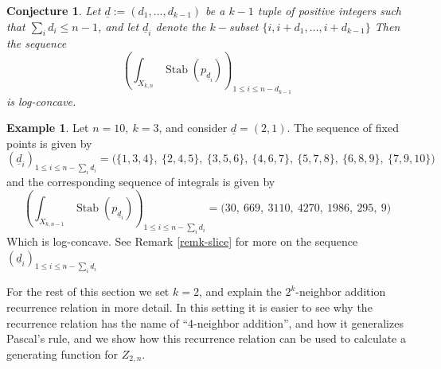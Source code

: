 \documentclass[12 pt]{article}
\theoremstyle{plain}
\theoremstyle{plain}
\theoremstyle{plain}
\theoremstyle{plain}
\theoremstyle{plain}
\theoremstyle{plain}
\theoremstyle{plain}
\theoremstyle{plain}
\theoremstyle{plain}
\newtheorem{conjecture}[theorem]{Conjecture}
\theoremstyle{plain}
\theoremstyle{remark}
\theoremstyle{remark}
\theoremstyle{definition}
\theoremstyle{definition}
\theoremstyle{definition}
\newtheorem{example}{Example}[section]
\theoremstyle{definition}
\theoremstyle{definition}
\theoremstyle{definition}
\DeclareMathOperator{\Stab}{Stab}
\begin{document}
\begin{conjecture}
    Let $\underline{d}:=(d_{1},\dots,d_{k-1})$ be a $k-1$ tuple of positive integers such that \newline$\sum_{i}d_{i}\leq n-1$, and let $\underline{d}_{i}$ denote the $k-$subset $\{i,i+d_{1},\dots, i+d_{k-1}\}$ Then the sequence 
    \[
    \left(\int_{X_{k,n}}\Stab(p_{\underline{d}_{i}})\right)_{1\leq i\leq n-d_{k-1}}
    \]
    is log-concave.
\end{conjecture}
\begin{example}\label{log-concavity-example}
    Let $n=10,\ k=3$, and consider $\underline{d}=(2,1)$. The sequence of fixed points is given by
    \[
    (\underline{d}_{i})_{1\leq i\leq n-\sum_{i}d_{i}}=\Big(\{1,3,4\},\ \{2,4,5\},\ \{3,5,6\},\ \{4,6,7\},\ \{5,7,8\},\ \{6,8,9\},\ \{7,9,10\}\Big)
    \] and the corresponding sequence of integrals is given by
    \[\left(\int_{X_{k,n-1}}\Stab(p_{\underline{d}_{i}})\right)_{1\leq i\leq n-\sum_{i}d_{i}}=\Big(30,\ 669,\ 3110,\ 4270,\ 1986,\ 295,\ 9\Big)\]
    Which is log-concave. See Remark \ref{remk-slice} for more on the sequence $(\underline{d}_{i})_{1\leq i\leq n-\sum_{i}d_{i}}$
\end{example}

For the rest of this section we set $k=2$, and explain the $2^k$-neighbor addition recurrence relation in more detail. In this setting it is easier to see why the recurrence relation has the name of ``4-neighbor addition'', and how it generalizes Pascal's rule, and we show how this recurrence relation can be used to calculate a generating function for $Z_{2,n}$. 
\end{document}

